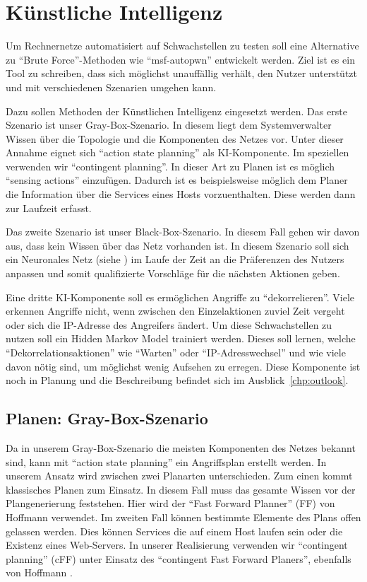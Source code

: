 \section{Künstliche Intelligenz}
\label{sec:ki}
\authors{\DK}{\LM \and \MW \and \DE}

Um Rechnernetze automatisiert auf Schwachstellen zu testen soll eine
Alternative zu \enquote{Brute Force}-Methoden wie \enquote{msf-autopwn} entwickelt
werden. Ziel ist es ein Tool zu schreiben, dass sich möglichst
unauffällig verhält, den Nutzer unterstützt und mit verschiedenen
Szenarien umgehen kann.

Dazu sollen Methoden der Künstlichen Intelligenz eingesetzt werden.
Das erste Szenario ist unser Gray-Box-Szenario.  In diesem liegt
dem Systemverwalter Wissen über die Topologie und die Komponenten des
Netzes vor.  Unter dieser Annahme eignet sich \enquote{action state
planning} \cite{russel-norvig-2003} als KI-Komponente. Im speziellen
verwenden wir \enquote{contingent planning}. In dieser Art zu Planen ist
es möglich \enquote{sensing actions} einzufügen.  Dadurch ist es
beispielsweise möglich dem Planer die Information über die Services
eines Hosts vorzuenthalten. Diese werden dann zur Laufzeit erfasst.

Das zweite Szenario ist unser Black-Box-Szenario. In diesem Fall
gehen wir davon aus, dass kein Wissen über das Netz vorhanden ist. In
diesem Szenario soll sich ein Neuronales Netz (siehe
\cite{russel-norvig-2003,mitchel}) im Laufe der Zeit an die
Präferenzen des Nutzers anpassen und somit qualifizierte Vorschläge
für die nächsten Aktionen geben.

Eine dritte KI-Komponente soll es ermöglichen Angriffe zu
\enquote{dekorrelieren}. Viele  erkennen Angriffe
nicht, wenn zwischen den Einzelaktionen zuviel Zeit vergeht oder sich
die IP-Adresse des Angreifers ändert. Um diese Schwachstellen zu
nutzen soll ein Hidden Markov Model trainiert werden.  Dieses soll
lernen, welche \enquote{Dekorrelationsaktionen} wie \enquote{Warten} oder
\enquote{IP-Adresswechsel} und wie viele davon nötig sind, um möglichst wenig
Aufsehen zu erregen. Diese Komponente ist noch in Planung und die
Beschreibung befindet sich im Ausblick~\ref{chp:outlook}.

\subsection{Planen: Gray-Box-Szenario}

Da in unserem Gray-Box-Szenario die meisten Komponenten des Netzes
bekannt sind, kann mit \enquote{action state planning} ein Angriffsplan
erstellt werden. In unserem Ansatz wird zwischen zwei Planarten
unterschieden. Zum einen kommt klassisches Planen zum Einsatz. In
diesem Fall muss das gesamte Wissen vor der Plangenerierung
feststehen. Hier wird der \enquote{Fast Forward Planner} (FF) von Hoffmann
\cite{FF} verwendet. Im zweiten Fall können bestimmte Elemente des
Plans offen gelassen werden.  Dies können Services die auf einem Host
laufen sein oder die Existenz eines Web-Servers. In unserer
Realisierung verwenden wir \enquote{contingent planning} (cFF) unter Einsatz
des \enquote{contingent Fast Forward Planers}, ebenfalls von Hoffmann
\cite{CFF}.

